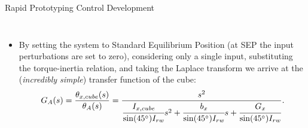 \documentclass[slidestop,compress]{beamer}
\begin{document}
\begin{frame}[plain]
\begin{block}{\hspace{90 mm} Rapid Prototyping \hspace{170 mm} Control Development}
\begin{columns}
\begin{itemize}
\[
\sum M_0^{+ \circlearrowleft} = I_{x,cube} \ddot{\theta}_{x,cube} = T^0_{Ax} + T^0_{Bx} - T^0_{Cx} - T^0_{Dx} + T^0_x - \dot{\theta}_{x,cube} - G_x \theta_{x,cube}.
\] 

\item By setting the system to Standard Equilibrium Position (at SEP the input perturbations are set to zero), considering only a single input, substituting the torque-inertia relation,  and taking the Laplace transform we arrive at the ({\emph{incredibly simple}}) transfer function of the cube:
\[G_A(s)=\frac{\theta_{x,cube}(s)}{\theta_A(s)}=\frac{s^2}{\cfrac{I_{x,cube}}{\sin(45^{\circ}) I_{rw}}s^2 + \cfrac{b_x}{\sin(45^{\circ}) I_{rw}}s + \cfrac{G_x}{\sin(45^{\circ}) I_{rw}}}.
\]
\end{itemize}
\end{columns}
\end{block}    
\end{frame}
\end{document}
